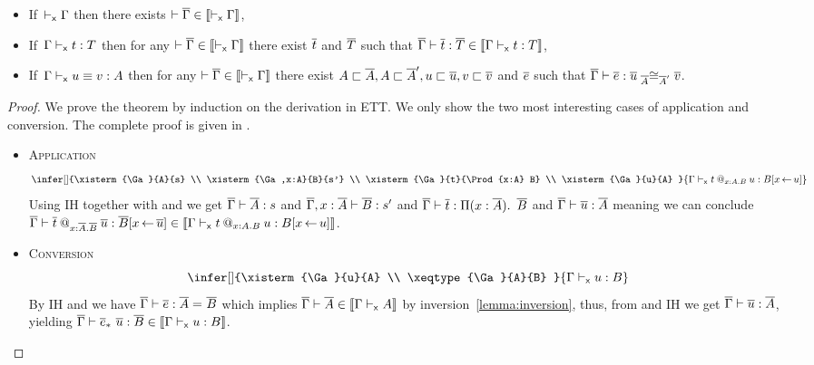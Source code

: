\begin{theorem}[Translation]
  \label{thm:translation}
  \leavevmode
  \begin{itemize}
    \item If\,\,\,$\vdash_{\mathsf{x}} \Gamma$ then there exists
    $\vdash \overline{\Gamma} \in \llbracket \vdash_{\mathsf{x}} \Gamma \rrbracket$,

    \item If\,\,\,$\Gamma \vdash_{\mathsf{x}} t : T$ then for any
    $\vdash \overline{\Gamma} \in \llbracket \vdash_{\mathsf{x}} \Gamma \rrbracket$ there exist $\overline{t}$ and $\overline{T}$ such
    that $\overline{\Gamma} \vdash \overline{t} : \overline{T} \in \llbracket \Gamma \vdash_{\mathsf{x}} t : T \rrbracket$,

    \item If\,\,\,$\Gamma \vdash_{\mathsf{x}} u \equiv v : A$ then for any
    $\vdash \overline{\Gamma} \in \llbracket \vdash_{\mathsf{x}} \Gamma \rrbracket$ there exist
    $A \sqsubset \overline{A}, A \sqsubset \overline{A}', u \sqsubset \overline{u}, v \sqsubset \overline{v}$ and $\overline{e}$ such that
    $\overline{\Gamma} \vdash \overline{e} : \overline{u} \mathrel{{}_{\overline{A}}{\cong}_{\overline{A}'}} \overline{v}$.
  \end{itemize}
\end{theorem}

\begin{proof}
  We prove the theorem by induction on the derivation in \acrshort{ETT}.
  We only show the two most interesting cases of application and conversion.
  The complete proof is given in .

  \begin{itemize}
    \item \textsc{Application}
    \[
      \infer[]
        {\xisterm{\Ga}{A}{s} \\
         \xisterm{\Ga,x:A}{B}{s'} \\
         \xisterm{\Ga}{t}{\Prod{x:A} B} \\
         \xisterm{\Ga}{u}{A}
        }
        {\xisterm{\Ga}{\app{t}{x:A}{B}{u}}{B[x \sto u]}}
    \]
    Using IH together with  and 
    we get $\overline{\Gamma} \vdash \overline{A} : s$ and $\overline{\Gamma},x:\overline{A} \vdash \overline{B} : s'$ and
    $\overline{\Gamma} \vdash \overline{t} : \mathop{\Pi(x:\overline{A}).\ } \overline{B}$ and $\overline{\Gamma} \vdash \overline{u} : \overline{A}$
    meaning we can conclude
    $\overline{\Gamma} \vdash \overline{t}\mathbin{@_{x:\overline{A}.\overline{B}}} \overline{u} : \overline{B}[x \mathop{\leftarrow} \overline{u}]
    \in \llbracket \Gamma \vdash_{\mathsf{x}} t\mathbin{@_{x:A.B}} u : B[x \mathop{\leftarrow} u] \rrbracket$.

    \item \textsc{Conversion}
    \[
      \infer[]
        {\xisterm{\Ga}{u}{A} \\
         \xeqtype{\Ga}{A}{B}
        }
        {\xisterm{\Ga}{u}{B}}
    \]
    By IH and  we have
    $\overline{\Gamma} \vdash \overline{e} : \overline{A} =_{} \overline{B}$ which implies
    $\overline{\Gamma} \vdash \overline{A} \in \llbracket \Gamma \vdash_{\mathsf{x}} A \rrbracket$ by
    inversion~\eqref{lemma:inversion}, thus, from 
    and IH we get $\overline{\Gamma} \vdash \overline{u} : \overline{A}$, yielding
    $\overline{\Gamma} \vdash \overline{e}_*\ \overline{u} : \overline{B} \in \llbracket \Gamma \vdash_{\mathsf{x}} u : B \rrbracket$.
  \end{itemize}

\end{proof}


